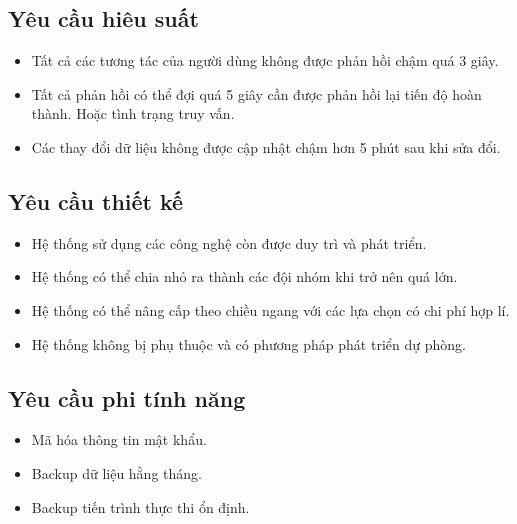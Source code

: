 \subsection{Yêu cầu hiêu suất}
\begin{itemize}
	\item Tất cả các tương tác của người dùng không được phản hồi chậm quá 3 giây.
	\item Tất cả phản hồi có thể đợi quá 5 giây cần được phản hồi lại tiến độ hoàn thành. Hoặc tình trạng truy vấn.
	\item Các thay đổi dữ liệu không được cập nhật chậm hơn 5 phút sau khi sửa đổi.
\end{itemize}

\subsection{Yêu cầu thiết kế}
\begin{itemize}
	\item Hệ thống sử dụng các công nghệ còn được duy trì và phát triển.
	\item Hệ thống có thể chia nhỏ ra thành các đội nhóm khi trở nên quá lớn.
	\item Hệ thống có thể nâng cấp theo chiều ngang với các lựa chọn có chi phí hợp lí.
	\item Hệ thống không bị phụ thuộc và có phương pháp phát triển dự phòng.
\end{itemize}

\subsection{Yêu cầu phi tính năng}
\begin{itemize}
	\item Mã hóa thông tin mật khẩu.
	\item Backup dữ liệu hằng tháng.
	\item Backup tiến trình thực thi ổn định.
\end{itemize}